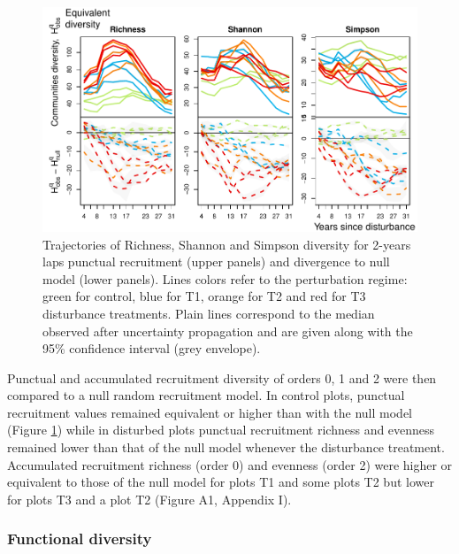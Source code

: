 \documentclass[fleqn,10pt]{ArtEcoFoG} %
\begin{document}
\begin{figure}

{\centering \includegraphics[width=0.8\linewidth]{RecruitmentTrajectories_files/figure-latex/Fig1-1} 

}

\caption{Trajectories of Richness, Shannon and Simpson diversity for 2-years laps punctual  recruitment (upper panels) and divergence to null model (lower panels). Lines colors refer to the perturbation regime: green for control, blue for T1, orange for T2 and red for T3 disturbance treatments. Plain lines correspond to the median observed after uncertainty propagation and are given along with the 95\% confidence interval (grey envelope).}\label{fig:Fig1}
\end{figure}

Punctual and accumulated recruitment diversity of orders 0, 1 and 2 were
then compared to a null random recruitment model. In control plots,
punctual recruitment values remained equivalent or higher than with the
null model (Figure \ref{fig:Fig1}) while in disturbed plots punctual
recruitment richness and evenness remained lower than that of the null
model whenever the disturbance treatment. Accumulated recruitment
richness (order 0) and evenness (order 2) were higher or equivalent to
those of the null model for plots T1 and some plots T2 but lower for
plots T3 and a plot T2 (Figure A1, Appendix I).

\subsubsection{Functional diversity}\label{functional-diversity}
\end{document}
